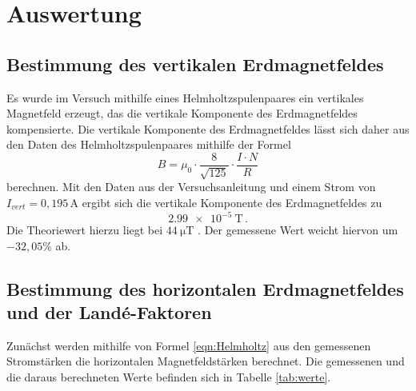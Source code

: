 \newpage
\section{Auswertung}
\label{sec:Auswertung}

\subsection{Bestimmung des vertikalen Erdmagnetfeldes}
\label{subsec:vertikal}

Es wurde im Versuch mithilfe eines Helmholtzspulenpaares ein vertikales Magnetfeld
erzeugt, das die vertikale Komponente des Erdmagnetfeldes kompensierte. Die vertikale
Komponente des Erdmagnetfeldes lässt sich daher aus den Daten des Helmholtzspulenpaares
mithilfe der Formel
\begin{equation}
    B= \mu_0 \cdot  \frac{8}{\sqrt {125}}\cdot \frac{I\cdot N}{R}
    \label{eqn:Helmholtz}
\end{equation}
berechnen. Mit den Daten aus der Versuchsanleitung \cite{Versuchsanleitung} und einem Strom von
$I_{vert}=0{,}195\,$A ergibt sich die vertikale Komponente des Erdmagnetfeldes zu
\begin{equation*}
  \SI{2.99e-5}{\tesla}\,.
\end{equation*}
Die Theoriewert hierzu liegt bei $\SI{44}{\micro\tesla}$ \cite{erde}. Der gemessene Wert
weicht hiervon um $-32{,}05\%$ ab.

\subsection{Bestimmung des horizontalen Erdmagnetfeldes und der Landé-Faktoren}
\label{subsec:horizontal}

Zunächst werden mithilfe von Formel \eqref{eqn:Helmholtz} aus den gemessenen Stromstärken
die horizontalen Magnetfeldstärken berechnet. Die gemessenen und die daraus berechneten Werte befinden sich
in Tabelle \ref{tab:werte}.


